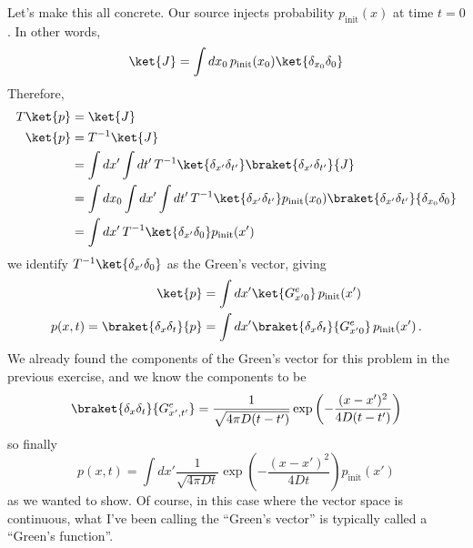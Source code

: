 Let's make this all concrete.
Our source injects probability $p_\text{init}(x)$ at time $t=0$.
In other words,
\begin{equation*}
  \ket{J} = \int dx_0 \, p_\text{init}(x_0) \ket{\delta_{x_0} \delta_0}
\end{equation*}
Therefore,
\begin{align*}
  T \ket{p} &= \ket{J} \\
  \ket{p} &= T^{-1} \ket{J} \\
  &= \int dx' \int dt' \, T^{-1} \ket{\delta_{x'} \delta_{t'}} \braket{\delta_{x'} \delta_{t'}}{J} \\
  &= \int dx_0 \int dx' \int dt' \, T^{-1} \ket{\delta_{x'} \delta_{t'}} p_\text{init}(x_0) \braket{\delta_{x'} \delta_{t'}}{\delta_{x_0} \delta_0} \\
  &= \int dx' \, T^{-1} \ket{\delta_{x'} \delta_0} p_\text{init}(x')
\end{align*}
we identify $T^{-1} \ket{\delta_{x'} \delta_0}$ as the Green's vector, giving
\begin{align*}
  \ket{p} &= \int dx' \ket{G^e_{x' 0}} \, p_\text{init}(x') \\
  p(x, t) = \braket{\delta_x \delta_t}{p}
  &= \int dx' \braket{\delta_x\delta_t}{G^e_{x' 0}} \, p_\text{init}(x')
  \, .
\end{align*}
We already found the components of the Green's vector for this problem in the previous exercise, and we know the components to be
\begin{equation*}
  \braket{\delta_x \delta_t}{G^e_{x', t'}} = \frac{1}{\sqrt{4 \pi D (t - t')}}\exp \left( - \frac{(x - x')^2}{4 D (t - t')} \right)
\end{equation*}
so finally
\begin{equation*}
  p(x, t) = \int dx' \frac{1}{\sqrt{4 \pi D t}} \exp \left( - \frac{(x - x')^2}{4 D t} \right)
  p_\text{init}(x')
\end{equation*}
as we wanted to show.
Of course, in this case where the vector space is continuous, what I've been calling the ``Green's vector'' is typically called a ``Green's function''.



